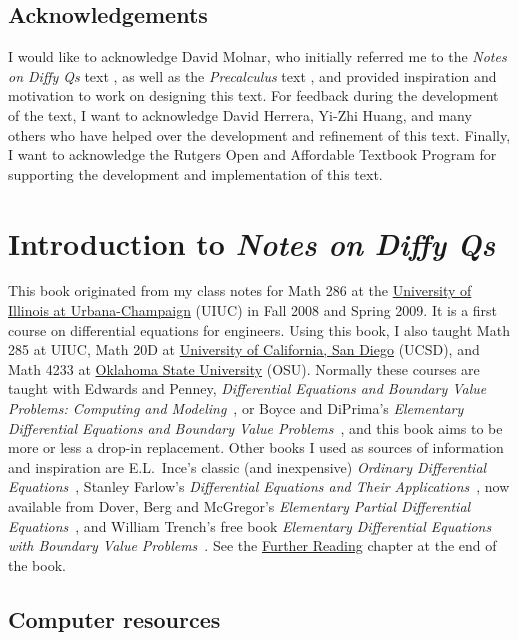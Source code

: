 \subsection*{Acknowledgements}

I would like to acknowledge David Molnar, who initially referred me to the \emph{Notes on Diffy Qs} text \cite{JL}, as well as the \emph{Precalculus} text \cite{SZ}, and provided inspiration and motivation to work on designing this text. For feedback during the development of the text, I want to acknowledge David Herrera, Yi-Zhi Huang, and many others who have helped over the development and refinement of this text. Finally, I want to acknowledge the Rutgers Open and Affordable Textbook Program for supporting the development and implementation of this text.  

\vfill

\pagebreak

\section*{Introduction to \emph{Notes on Diffy Qs}}

This book \cite{JL} originated from my class notes for Math 286
at the \href{https://www.math.uiuc.edu/}{University of Illinois at
Urbana-Champaign} (UIUC)
in Fall 2008 and
Spring 2009.
It is a first course on differential equations for engineers.
Using this book, I also taught Math 285 at UIUC\@,
Math 20D at
\href{https://www.math.ucsd.edu/}{University of California, San Diego} (UCSD),
and Math 4233 at 
\href{https://math.okstate.edu/}{Oklahoma State University} (OSU).
Normally these courses are taught with
Edwards and Penney, \emph{Differential
Equations and Boundary Value Problems: Computing and Modeling}~\cite{EP}, or
Boyce and DiPrima's
\emph{Elementary
Differential Equations and Boundary Value Problems}~\cite{BD},
and this book aims to be more or less a drop-in replacement.
Other books I used as sources of information and inspiration
are E.L.\ Ince's classic (and inexpensive)
\emph{Ordinary Differential Equations}~\cite{I},
Stanley Farlow's \emph{Differential Equations and Their
Applications}~\cite{F}, now available from Dover,
Berg and McGregor's
\emph{Elementary Partial Differential Equations}~\cite{BM},
and William Trench's free book
\emph{Elementary
Differential Equations with Boundary Value Problems}~\cite{T}.
See the \hyperref[furtherreading:chapter]{Further Reading} chapter at the end of the book.


\subsection*{Computer resources}

